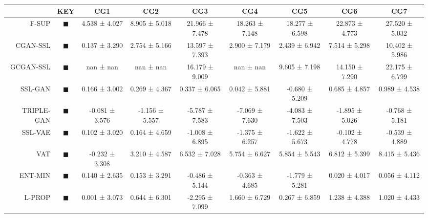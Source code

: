 \begin{tabular}{rcccccccc}
\toprule
{} &                                                                      KEY &             CG1 &             CG2 &             CG3 &             CG4 &             CG5 &             CG6 &             CG7 \\
\midrule
F-SUP      &           \textcolor{FULLY_SUPERVISED_CLASSIFIER}{\LARGE $\blacksquare$} &   4.538 ± 4.027 &   8.905 ± 5.018 &  21.966 ± 7.478 &  18.263 ± 7.148 &  18.277 ± 6.598 &  22.873 ± 4.773 &  27.520 ± 5.032 \\
CGAN-SSL   &   \textcolor{CGAN_BASIC_DJ_SUPERVISED_CLASSIFIER}{\LARGE $\blacksquare$} &   0.137 ± 3.290 &   2.754 ± 5.166 &  13.597 ± 7.393 &   2.900 ± 7.179 &   2.439 ± 6.942 &   7.514 ± 5.298 &  10.402 ± 5.986 \\
GCGAN-SSL  &  \textcolor{CGAN_GUMBEL_DJ_SUPERVISED_CLASSIFIER}{\LARGE $\blacksquare$} &       nan ± nan &       nan ± nan &  16.179 ± 9.009 &       nan ± nan &   9.605 ± 7.198 &  14.150 ± 7.290 &  22.175 ± 6.799 \\
SSL-GAN    &                               \textcolor{SSL_GAN}{\LARGE $\blacksquare$} &   0.166 ± 3.002 &   0.269 ± 4.367 &   0.337 ± 6.065 &   0.042 ± 5.881 &  -0.680 ± 5.209 &   0.685 ± 4.857 &   0.989 ± 4.538 \\
TRIPLE-GAN &                            \textcolor{TRIPLE_GAN}{\LARGE $\blacksquare$} &  -0.081 ± 3.576 &  -1.156 ± 5.557 &  -5.787 ± 7.583 &  -7.069 ± 7.630 &  -4.083 ± 7.503 &  -1.895 ± 5.026 &  -0.768 ± 5.181 \\
SSL-VAE    &                               \textcolor{SSL_VAE}{\LARGE $\blacksquare$} &   0.102 ± 3.020 &   0.164 ± 4.659 &  -1.008 ± 6.895 &  -1.375 ± 6.257 &  -1.622 ± 5.673 &  -0.102 ± 4.778 &  -0.539 ± 4.889 \\
VAT        &                                   \textcolor{VAT}{\LARGE $\blacksquare$} &  -0.232 ± 3.308 &   3.210 ± 4.587 &   6.532 ± 7.028 &   5.754 ± 6.627 &   5.854 ± 5.543 &   6.812 ± 5.399 &   8.415 ± 5.436 \\
ENT-MIN    &                  \textcolor{ENTROPY_MINIMISATION}{\LARGE $\blacksquare$} &   0.140 ± 2.635 &   0.153 ± 3.291 &  -0.486 ± 5.144 &  -0.363 ± 4.685 &  -1.779 ± 5.281 &   0.020 ± 4.017 &   0.056 ± 4.112 \\
L-PROP     &                     \textcolor{LABEL_PROPAGATION}{\LARGE $\blacksquare$} &   0.001 ± 3.073 &   0.644 ± 6.301 &  -2.295 ± 7.099 &   1.660 ± 6.729 &   0.267 ± 6.859 &   1.238 ± 4.388 &   1.020 ± 4.433 \\

\end{tabular}
